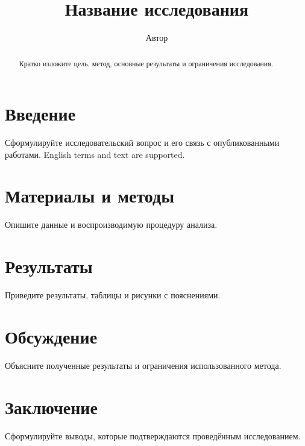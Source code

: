 \documentclass[12pt,a4paper]{article}
\title{Название исследования}
\author{Автор}
\date{}
\begin{document}
\maketitle

\begin{abstract}
Кратко изложите цель, метод, основные результаты и ограничения исследования.
\end{abstract}

\section{Введение}
Сформулируйте исследовательский вопрос и его связь с опубликованными работами.
\foreignlanguage{english}{English terms and text are supported.}

\section{Материалы и методы}
Опишите данные и воспроизводимую процедуру анализа.

\section{Результаты}
Приведите результаты, таблицы и рисунки с пояснениями.

\section{Обсуждение}
Объясните полученные результаты и ограничения использованного метода.

\section{Заключение}
Сформулируйте выводы, которые подтверждаются проведённым исследованием.

% 
% 
\end{document}

